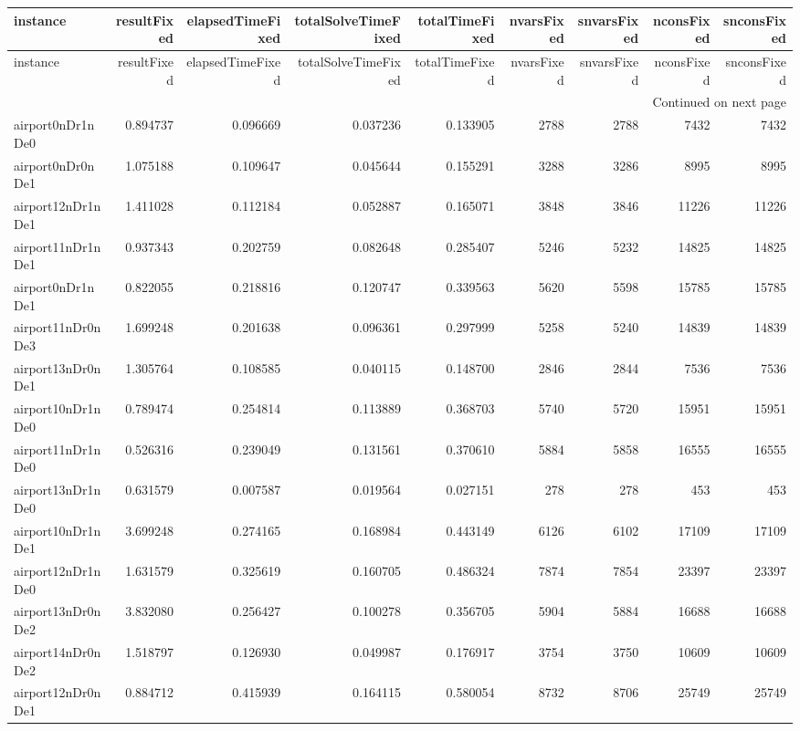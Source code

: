 \begin{longtable}{|l|r|r|r|r|r|r|r|r|}
\toprule
instance & resultFixed & elapsedTimeFixed & totalSolveTimeFixed & totalTimeFixed & nvarsFixed & snvarsFixed & nconsFixed & snconsFixed \\
\midrule
\endfirsthead
\toprule
instance & resultFixed & elapsedTimeFixed & totalSolveTimeFixed & totalTimeFixed & nvarsFixed & snvarsFixed & nconsFixed & snconsFixed \\
\midrule
\endhead
\midrule
\multicolumn{9}{r}{Continued on next page} \\
\midrule
\endfoot
\bottomrule
\endlastfoot
airport0nDr1nDe0 & 0.894737 & 0.096669 & 0.037236 & 0.133905 & 2788 & 2788 & 7432 & 7432 \\
airport0nDr0nDe1 & 1.075188 & 0.109647 & 0.045644 & 0.155291 & 3288 & 3286 & 8995 & 8995 \\
airport12nDr1nDe1 & 1.411028 & 0.112184 & 0.052887 & 0.165071 & 3848 & 3846 & 11226 & 11226 \\
airport11nDr1nDe1 & 0.937343 & 0.202759 & 0.082648 & 0.285407 & 5246 & 5232 & 14825 & 14825 \\
airport0nDr1nDe1 & 0.822055 & 0.218816 & 0.120747 & 0.339563 & 5620 & 5598 & 15785 & 15785 \\
airport11nDr0nDe3 & 1.699248 & 0.201638 & 0.096361 & 0.297999 & 5258 & 5240 & 14839 & 14839 \\
airport13nDr0nDe1 & 1.305764 & 0.108585 & 0.040115 & 0.148700 & 2846 & 2844 & 7536 & 7536 \\
airport10nDr1nDe0 & 0.789474 & 0.254814 & 0.113889 & 0.368703 & 5740 & 5720 & 15951 & 15951 \\
airport11nDr1nDe0 & 0.526316 & 0.239049 & 0.131561 & 0.370610 & 5884 & 5858 & 16555 & 16555 \\
airport13nDr1nDe0 & 0.631579 & 0.007587 & 0.019564 & 0.027151 & 278 & 278 & 453 & 453 \\
airport10nDr1nDe1 & 3.699248 & 0.274165 & 0.168984 & 0.443149 & 6126 & 6102 & 17109 & 17109 \\
airport12nDr1nDe0 & 1.631579 & 0.325619 & 0.160705 & 0.486324 & 7874 & 7854 & 23397 & 23397 \\
airport13nDr0nDe2 & 3.832080 & 0.256427 & 0.100278 & 0.356705 & 5904 & 5884 & 16688 & 16688 \\
airport14nDr0nDe2 & 1.518797 & 0.126930 & 0.049987 & 0.176917 & 3754 & 3750 & 10609 & 10609 \\
airport12nDr0nDe1 & 0.884712 & 0.415939 & 0.164115 & 0.580054 & 8732 & 8706 & 25749 & 25749 \\

\end{longtable}
